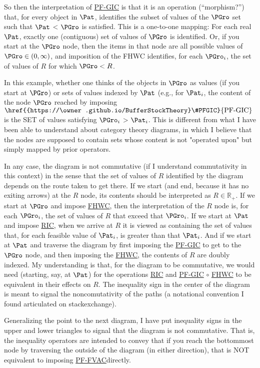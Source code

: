 \documentclass[\econtexRoot/BufferStockTheory]{subfiles}
\newcommand{\BSTlinkTo}{https://\owner.github.io/BufferStockTheory}
\renewcommand{\FHWC}{\href{{\BSTlinkTo}FHWC}{\textrm{FHWC}}}
\renewcommand{\FHWC}{\href{{\BSTlinkTo}\#FHWC}{\textrm{FHWC}}}
\renewcommand{\PFGIC}{\href{{\BSTlinkTo}\#PFGIC}{\textrm{PF-GIC}}}
\renewcommand{\RIC}{\href{{\BSTlinkTo}\#RIC}{\textrm{RIC}}}
\renewcommand{\PFFVAC}{\href{{\BSTlinkTo}\#PFFVAC}{\textrm{PF-FVAC}}}
\begin{document}
\begin{CDCPrivate}
So then the interpretation of {\PFGIC} is that it is an operation (``morphism?'') that, for every object in $\Pat$, identifies the subset of values of the $\PGro$ set such that $\Pat$ < $\PGro$ is satisfied. This is a one-to-one mapping: For each real $\Pat$, exactly one (contiguous) set of values of $\PGro$ is identified. Or, if you start at the $\PGro$ node, then the items in that node are all possible values of $\PGro \in (0,\infty)$, and imposition of the FHWC identifies, for each $\PGro_{i}$, the set of values of ${R}$ for which $\PGro < {R}$.

In this example, whether one thinks of the objects in $\PGro$ as values (if you start at $\PGro$) or sets of values indexed by $\Pat$ (e.g., for $\Pat_i$, the content of the node $\PGro$ reached by imposing $\PFGIC$ is the SET of values satisfying $\PGro_{i} $ > $\Pat_i$. This is different from what I have been able to understand about category theory diagrams, in which I believe that the nodes are supposed to contain sets whose content is not "operated upon" but simply mapped by prior operators.

In any case, the diagram is not commutative (if I understand commutativity in this context) in the sense that the set of values of ${R}$ identified by the diagram depends on the route taken to get there.  If we start (and end, because it has no exiting arrows) at the ${R}$ node, its contents should be interpreted as ${R} \in \mathbb{R}_{+}$.  If we start at $\PGro$ and impose {\FHWC}, then the interpretation of the ${R}$ node is, for each $\PGro_{i}$, the set of values of ${R}$ that exceed that $\PGro_{i}$.  If we start at $\Pat$ and impose {\RIC}, when we arrive at ${R}$ it is viewed as containing the set of values that, for each feasible value of $\Pat_{i}$, is greater than that $\Pat_{i}$. And if we start at $\Pat$ and traverse the diagram by first imposing the {\PFGIC} to get to the $\PGro$ node, and then imposing the {\FHWC}, the contents of ${R}$ are doubly indexed. My understanding is that, for the diagram to be commutative, we would need (starting, say, at $\Pat$) for the operations {\RIC} and {\PFGIC} $\circ$ {\FHWC} to be equivalent in their effects on ${R}$. The inequality sign in the center of the diagram is meant to signal the noncomutativity of the paths (a notational convention I found articulated on stackexchange).

Generalizing the point to the next diagram, I have put inequality signs in the upper and lower triangles to signal that the diagram is not commutative. That is, the inequality operators are intended to convey that if you reach the bottommost node by traversing the outside of the diagram (in either direction), that is NOT equivalent to imposing \PFFVAC directly.


\end{CDCPrivate}
\end{document}
